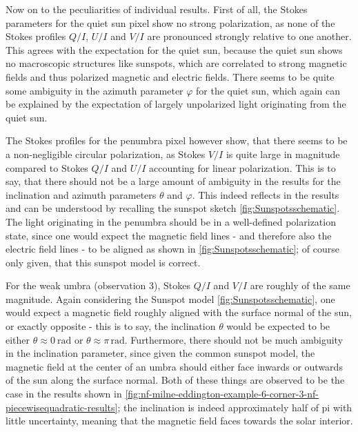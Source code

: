 \documentclass[a4paper,12pt]{report}
\begin{document}
Now on to the peculiarities of individual results. First of all, the Stokes parameters for the quiet sun pixel show no strong polarization, as none of the Stokes profiles $Q/I$, $U/I$ and $V/I$ are pronounced strongly relative to one another. This agrees with the expectation for the quiet sun, because the quiet sun shows no macroscopic structures like sunspots, which are correlated to strong magnetic fields and thus polarized magnetic and electric fields. There seems to be quite some ambiguity in the azimuth parameter $\varphi$ for the quiet sun, which again can be explained by the expectation of largely unpolarized light originating from the quiet sun.

The Stokes profiles for the penumbra pixel however show, that there seems to be a non-negligible circular polarization, as Stokes $V/I$ is quite large in magnitude compared to Stokes $Q/I$ and $U/I$ accounting for linear polarization. This is to say, that there should not be a large amount of ambiguity in the results for the inclination and azimuth parameters $\theta$ and $\varphi$. This indeed reflects in the results and can be understood by recalling the sunspot sketch \cref{fig:Sunspotsschematic}. The light originating in the penumbra should be in a well-defined polarization state, since one would expect the magnetic field lines - and therefore also the electric field lines - to be aligned as shown in \cref{fig:Sunspotsschematic}; of course only given, that this sunspot model is correct.

For the weak umbra (observation 3), Stokes $Q/I$ and $V/I$ are roughly of the same magnitude. Again considering the Sunspot model \cref{fig:Sunspotsschematic}, one would expect a magnetic field roughly aligned with the surface normal of the sun, or exactly opposite - this is to say, the inclination $\theta$ would be expected to be either $\theta \approx \SI{0}{\radian}$ or $\theta \approx \pi\,\si{\radian}$. Furthermore, there should not be much ambiguity in the inclination parameter, since given the common sunspot model, the magnetic field at the center of an umbra should either face inwards or outwards of the sun along the surface normal. Both of these things are observed to be the case in the results shown in \cref{fig:nf-milne-eddington-example-6-corner-3-nf-piecewisequadratic-results}; the inclination is indeed approximately half of pi with little uncertainty, meaning that the magnetic field faces towards the solar interior.
\end{document}
